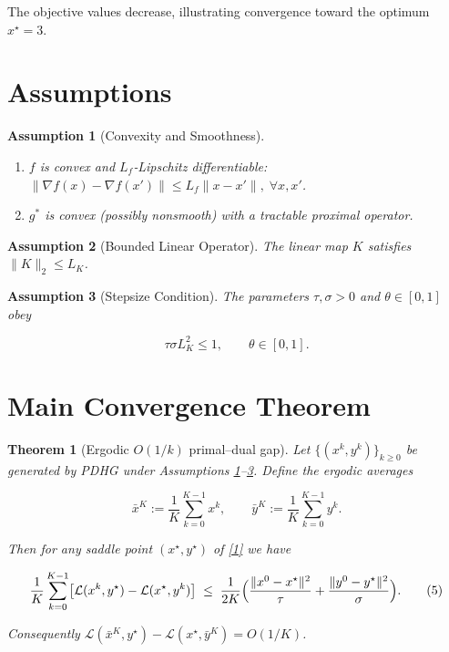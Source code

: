 \documentclass{article}
\newtheorem{theorem}{Theorem}
\newtheorem{assumption}{Assumption}
\begin{document}
The objective values decrease, illustrating convergence toward the optimum $x^{\star}=3$.

\section*{Assumptions}
\begin{assumption}[Convexity and Smoothness]
\label{as:convex}
\begin{enumerate}
  \item $f$ is convex and $L_f$‑Lipschitz differentiable:
  $\|\nabla f(x)-\nabla f(x')\|\le L_f\|x-x'\|,\;\forall x,x'$.
  \item $g^{*}$ is convex (possibly nonsmooth) with a tractable proximal operator.
\end{enumerate}
\end{assumption}
\begin{assumption}[Bounded Linear Operator]
\label{as:K}
The linear map $K$ satisfies $\|K\|_2\le L_K$.
\end{assumption}
\begin{assumption}[Stepsize Condition]
\label{as:steps}
The parameters $\tau,\sigma>0$ and $\theta\in[0,1]$ obey  

\[
\tau\sigma L_K^{2}\le 1,\qquad \theta\in[0,1].
\tag{4}
\]

\end{assumption}

\section*{Main Convergence Theorem}
\begin{theorem}[Ergodic $O(1/k)$ primal–dual gap]
\label{thm:conv}
Let $\{(x^{k},y^{k})\}_{k\ge0}$ be generated by PDHG under Assumptions \ref{as:convex}–\ref{as:steps}.  
Define the ergodic averages  

\[
\bar x^{K}:=\frac{1}{K}\sum_{k=0}^{K-1}\!x^{k},\qquad
\bar y^{K}:=\frac{1}{K}\sum_{k=0}^{K-1}\!y^{k}.
\]

Then for any saddle point $(x^{\star},y^{\star})$ of \eqref{1} we have  

\[
\frac{1}{K}\sum_{k=0}^{K-1}\bigl[\mathcal L(x^{k},y^{\star})-\mathcal L(x^{\star},y^{k})\bigr]
\;\le\;
\frac{1}{2K}\Bigl(\frac{\|x^{0}-x^{\star}\|^{2}}{\tau}
      +\frac{\|y^{0}-y^{\star}\|^{2}}{\sigma}\Bigr).
\tag{5}
\]

Consequently $\mathcal L(\bar x^{K},y^{\star})-\mathcal L(x^{\star},\bar y^{K})=O(1/K)$. 
\end{theorem}
\end{document}
